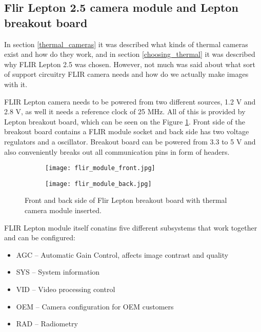 \subsection{ Flir Lepton 2.5 camera module and Lepton breakout board}

In section \ref{thermal_cameras} it was described what kinds of thermal cameras exist and how do they work, and in section \ref{choosing_thermal} it was described why FLIR Lepton 2.5 was chosen.
However, not much was said about what sort of support circuitry FLIR camera needs and how do we actually make images with it.

FLIR Lepton camera needs to be powered from two different sources, 1.2 \si{\volt} and 2.8 \si{\volt}, as well it needs a reference clock of 25 \si{\mega\hertz}.
All of this is provided by Lepton breakout board, which can be seen on the Figure \ref{lepton_breakout}.
Front side of the breakout board contains a FLIR module socket and back side has two voltage regulators and a oscillator.
Breakout board can be powered from 3.3 to 5 \si{\volt} and also conveniently breaks out all communication pins in form of headers.

\begin{figure}[ht] 
    \begin{subfigure}[b]{0.5\textwidth}
        \centering
        \texttt{[image: flir\_module\_front.jpg]} 
    \end{subfigure}
    \begin{subfigure}[b]{0.5\textwidth}
        \centering
        \texttt{[image: flir\_module\_back.jpg]} 
    \end{subfigure}
    \caption{ Front and back side of Flir Lepton breakout board with thermal camera module inserted.}
    \label{lepton_breakout}
\end{figure}

FLIR Lepton module itself conatins five different subsystems that work together and can be configured:

\begin{itemize}
    \item AGC – Automatic Gain Control, affects image contrast and quality
    \item SYS – System information
    \item VID – Video processing control
    \item OEM – Camera configuration for OEM customers
    \item RAD – Radiometry
\end{itemize}

